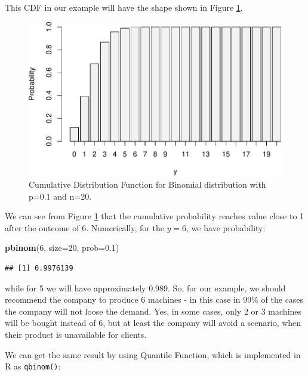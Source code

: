 \documentclass[
]{book}
\newenvironment{Shaded}{\begin{snugshade}}{\end{snugshade}}
\newcommand{\DataTypeTok}[1]{\textcolor[rgb]{0.13,0.29,0.53}{#1}}
\newcommand{\DecValTok}[1]{\textcolor[rgb]{0.00,0.00,0.81}{#1}}
\newcommand{\FloatTok}[1]{\textcolor[rgb]{0.00,0.00,0.81}{#1}}
\newcommand{\KeywordTok}[1]{\textcolor[rgb]{0.13,0.29,0.53}{\textbf{#1}}}
\newcommand{\NormalTok}[1]{#1}
\theoremstyle{definition}
\theoremstyle{definition}
\theoremstyle{definition}
\theoremstyle{definition}
\theoremstyle{remark}
\begin{document}
This CDF in our example will have the shape shown in Figure \ref{fig:binomialCDF01}.

\begin{figure}
\centering
\includegraphics{Svetunkov---Statistics-for-Business-Analytics_files/figure-latex/binomialCDF01-1.pdf}
\caption{\label{fig:binomialCDF01}Cumulative Distribution Function for Binomial distribution with p=0.1 and n=20.}
\end{figure}

We can see from Figure \ref{fig:binomialCDF01} that the cumulative probability reaches value close to 1 after the outcome of 6. Numerically, for the \(y=6\), we have probability:

\begin{Shaded}
\begin{Highlighting}[]
\KeywordTok{pbinom}\NormalTok{(}\DecValTok{6}\NormalTok{, }\DataTypeTok{size=}\DecValTok{20}\NormalTok{, }\DataTypeTok{prob=}\FloatTok{0.1}\NormalTok{)}
\end{Highlighting}
\end{Shaded}

\begin{verbatim}
## [1] 0.9976139
\end{verbatim}

while for 5 we will have approximately 0.989. So, for our example, we should recommend the company to produce 6 machines - in this case in 99\% of the cases the company will not loose the demand. Yes, in some cases, only 2 or 3 machines will be bought instead of 6, but at least the company will avoid a scenario, when their product is unavailable for clients.

We can get the same result by using Quantile Function, which is implemented in R as \texttt{qbinom()}:
\end{document}

